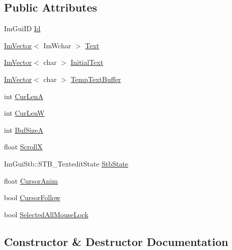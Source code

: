 \subsection*{Public Attributes}
\begin{DoxyCompactItemize}
\item 
Im\+Gui\+ID \hyperlink{struct_im_gui_text_edit_state_a72607b084143b202b03fd495b0eded2c}{Id}
\item 
\hyperlink{class_im_vector}{Im\+Vector}$<$ Im\+Wchar $>$ \hyperlink{struct_im_gui_text_edit_state_a5c387aca48db34089a3c0ff251ff06fc}{Text}
\item 
\hyperlink{class_im_vector}{Im\+Vector}$<$ char $>$ \hyperlink{struct_im_gui_text_edit_state_aba698d67719db7a6954475292cf50d28}{Initial\+Text}
\item 
\hyperlink{class_im_vector}{Im\+Vector}$<$ char $>$ \hyperlink{struct_im_gui_text_edit_state_a299fd7f0af7c81eae119d304bd0beaca}{Temp\+Text\+Buffer}
\item 
int \hyperlink{struct_im_gui_text_edit_state_a007dc39101b6b1cfa78dcbad828b8659}{Cur\+LenA}
\item 
int \hyperlink{struct_im_gui_text_edit_state_aee70a14eaf9dfb09bee698aef2de40b2}{Cur\+LenW}
\item 
int \hyperlink{struct_im_gui_text_edit_state_a73190bd16bf8bb58c827e66b9e28e071}{Buf\+SizeA}
\item 
float \hyperlink{struct_im_gui_text_edit_state_ace66da7fa5fc21a7faabe2696d366e22}{ScrollX}
\item 
Im\+Gui\+Stb\+::\+S\+T\+B\+\_\+\+Textedit\+State \hyperlink{struct_im_gui_text_edit_state_a0fb9de6739de31f44ecffce8ad239a5e}{Stb\+State}
\item 
float \hyperlink{struct_im_gui_text_edit_state_a743c35c5d6559183f41e09e32ae967f4}{Cursor\+Anim}
\item 
bool \hyperlink{struct_im_gui_text_edit_state_add85da462dc5bbb0295ae28ebec2ec5d}{Cursor\+Follow}
\item 
bool \hyperlink{struct_im_gui_text_edit_state_adee23632ed1703c731651b163c1f481c}{Selected\+All\+Mouse\+Lock}
\end{DoxyCompactItemize}


\subsection{Constructor \& Destructor Documentation}
\hypertarget{struct_im_gui_text_edit_state_a475df87b81e95f80fa7bda77ca47d9fc}{}\label{struct_im_gui_text_edit_state_a475df87b81e95f80fa7bda77ca47d9fc} 
